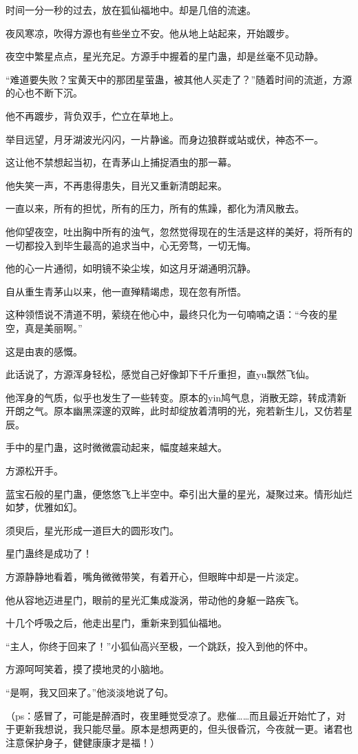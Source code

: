 \begin{this_body}
时间一分一秒的过去，放在狐仙福地中。却是几倍的流速。

夜风寒凉，吹得方源也有些坐立不安。他从地上站起来，开始踱步。

夜空中繁星点点，星光充足。方源手中握着的星门蛊，却是丝毫不见动静。

“难道要失败？宝黄天中的那团星萤蛊，被其他人买走了？”随着时间的流逝，方源的心也不断下沉。

他不再踱步，背负双手，伫立在草地上。

举目远望，月牙湖波光闪闪，一片静谧。而身边狼群或站或伏，神态不一。

这让他不禁想起当初，在青茅山上捕捉酒虫的那一幕。

他失笑一声，不再患得患失，目光又重新清朗起来。

一直以来，所有的担忧，所有的压力，所有的焦躁，都化为清风散去。

他仰望夜空，吐出胸中所有的浊气，忽然觉得现在的生活是这样的美好，将所有的一切都投入到毕生最高的追求当中，心无旁骛，一切无悔。

他的心一片通彻，如明镜不染尘埃，如这月牙湖通明沉静。

自从重生青茅山以来，他一直殚精竭虑，现在忽有所悟。

这种领悟说不清道不明，萦绕在他心中，最终只化为一句喃喃之语：“今夜的星空，真是美丽啊。”

这是由衷的感慨。

此话说了，方源浑身轻松，感觉自己好像卸下千斤重担，直yu飘然飞仙。

他浑身的气质，似乎也发生了一些转变。原本的yin鸠气息，消散无踪，转成清新开朗之气。原本幽黑深邃的双眸，此时却绽放着清明的光，宛若新生儿，又仿若星辰。

手中的星门蛊，这时微微震动起来，幅度越来越大。

方源松开手。

蓝宝石般的星门蛊，便悠悠飞上半空中。牵引出大量的星光，凝聚过来。情形灿烂如梦，优雅如幻。

须臾后，星光形成一道巨大的圆形攻门。

星门蛊终是成功了！

方源静静地看着，嘴角微微带笑，有着开心，但眼眸中却是一片淡定。

他从容地迈进星门，眼前的星光汇集成漩涡，带动他的身躯一路疾飞。

十几个呼吸之后，他走出星门，重新来到狐仙福地。

“主人，你终于回来了！”小狐仙高兴至极，一个跳跃，投入到他的怀中。

方源呵呵笑着，摸了摸地灵的小脑地。

“是啊，我又回来了。”他淡淡地说了句。

（ps：感冒了，可能是醉酒时，夜里睡觉受凉了。悲催……而且最近开始忙了，对于更新我想说，我只能尽量。原本是想两更的，但头很昏沉，今夜就一更。诸君也注意保护身子，健健康康才是福！）

\end{this_body}

